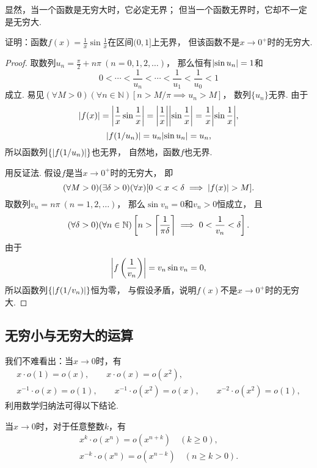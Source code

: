 显然，当一个函数是无穷大时，它必定无界；
但当一个函数无界时，它却不一定是无穷大.
\begin{example}
证明：函数\(f(x) = \frac1x \sin\frac1x\)在区间\((0,1]\)上无界，
但该函数不是\(x\to0^+\)时的无穷大.
\begin{proof}
取数列\(u_n = \frac{\pi}{2} + n\pi\ (n=0,1,2,\dotsc)\)，
那么恒有\(\abs{\sin u_n} = 1\)和\[
	0 < \dotsb < \frac1{u_n} < \dotsb < \frac1{u_1} < \frac1{u_0} < 1
\]成立.
易见\((\forall M > 0)(\forall n\in\mathbb{N})[n > M/\pi \implies u_n > M]\)，
数列\(\{u_n\}\)无界.
由于\[
	\abs{f(x)} = \abs{\frac1x \sin\frac1x}
	= \abs{\frac1x} \abs{\sin\frac1x}
	= \frac1x \abs{\sin\frac1x},
\]\[
	\abs{f(1/u_n)}
	= u_n \abs{\sin u_n}
	= u_n,
\]
所以函数列\(\{\abs{f(1/u_n)}\}\)也无界，
自然地，函数\(f\)也无界.

用反证法.
假设\(f\)是当\(x\to0^+\)时的无穷大，
即\[
	(\forall M>0)
	(\exists\delta>0)
	(\forall x)
	[
		0<x<\delta
		\implies
		\abs{f(x)}>M
	].
\]
取数列\(v_n = n\pi\ (n=1,2,\dotsc)\)，
那么\(\sin v_n = 0\)和\(v_n>0\)恒成立，
且\[
	(\forall\delta>0)
	(\forall n\in\mathbb{N})
	\left[n>\ceil*{\frac1{\pi\delta}} \implies 0<\frac1{v_n}<\delta\right].
\]
由于\[
	\abs{f\left(\frac1{v_n}\right)}
	= v_n \sin v_n
	= 0,
\]
所以函数列\(\{\abs{f(1/v_n)}\}\)恒为零，
与假设矛盾，说明\(f(x)\)不是\(x\to0^+\)时的无穷大.
\end{proof}
\end{example}

\subsection{无穷小与无穷大的运算}
我们不难看出：当\(x\to0\)时，有\begin{gather*}
	x \cdot o(1) = o(x), \qquad
	x \cdot o(x) = o(x^2), \\
	x^{-1} \cdot o(x) = o(1), \qquad
	x^{-1} \cdot o(x^2) = o(x), \qquad
	x^{-2} \cdot o(x^2) = o(1),
\end{gather*}
利用数学归纳法可得以下结论.
\begin{proposition}
当\(x\to0\)时，对于任意整数\(k\)，有\begin{gather}
	x^k \cdot o(x^n) = o(x^{n+k})
	\quad(k \geq 0), \\
	x^{-k} \cdot o(x^n) = o(x^{n-k})
	\quad(n \geq k > 0).
\end{gather}
\end{proposition}

